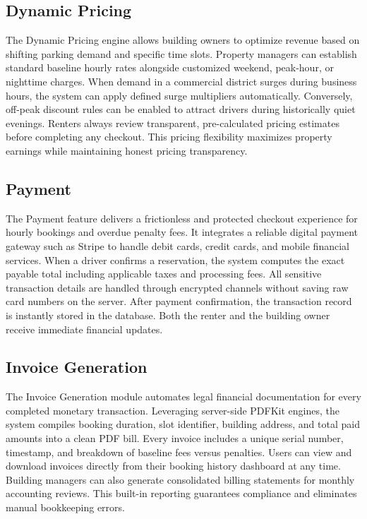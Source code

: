 \documentclass[12pt,a4paper]{article}
\begin{document}
\subsection{Dynamic Pricing}
The Dynamic Pricing engine allows building owners to optimize revenue based on shifting parking demand and specific time slots. Property managers can establish standard baseline hourly rates alongside customized weekend, peak-hour, or nighttime charges. When demand in a commercial district surges during business hours, the system can apply defined surge multipliers automatically. Conversely, off-peak discount rules can be enabled to attract drivers during historically quiet evenings. Renters always review transparent, pre-calculated pricing estimates before completing any checkout. This pricing flexibility maximizes property earnings while maintaining honest pricing transparency.

\subsection{Payment}
The Payment feature delivers a frictionless and protected checkout experience for hourly bookings and overdue penalty fees. It integrates a reliable digital payment gateway such as Stripe to handle debit cards, credit cards, and mobile financial services. When a driver confirms a reservation, the system computes the exact payable total including applicable taxes and processing fees. All sensitive transaction details are handled through encrypted channels without saving raw card numbers on the server. After payment confirmation, the transaction record is instantly stored in the database. Both the renter and the building owner receive immediate financial updates.

\subsection{Invoice Generation}
The Invoice Generation module automates legal financial documentation for every completed monetary transaction. Leveraging server-side PDFKit engines, the system compiles booking duration, slot identifier, building address, and total paid amounts into a clean PDF bill. Every invoice includes a unique serial number, timestamp, and breakdown of baseline fees versus penalties. Users can view and download invoices directly from their booking history dashboard at any time. Building managers can also generate consolidated billing statements for monthly accounting reviews. This built-in reporting guarantees compliance and eliminates manual bookkeeping errors.
\end{document}

